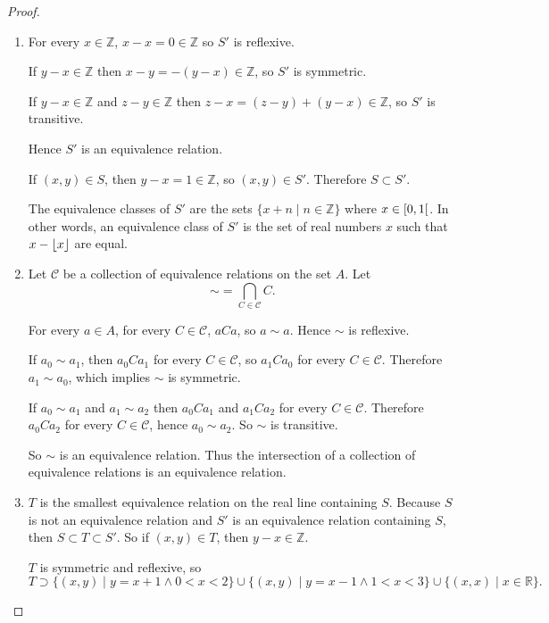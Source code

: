 \begin{proof}
    \begin{enumerate}[label={(\alph*)}]
        \item For every $x\in\mathbb{Z}$, $x - x = 0\in\mathbb{Z}$ so $S'$ is reflexive.

              If $y - x\in\mathbb{Z}$ then $x - y = -(y - x)\in\mathbb{Z}$, so $S'$ is symmetric.

              If $y - x\in\mathbb{Z}$ and $z - y\in\mathbb{Z}$ then $z - x = (z - y) + (y - x)\in\mathbb{Z}$, so $S'$ is transitive.

              Hence $S'$ is an equivalence relation.

              If $(x, y)\in S$, then $y - x = 1\in\mathbb{Z}$, so $(x, y)\in S'$. Therefore $S\subset S'$.

              The equivalence classes of $S'$ are the sets $\{ x + n \mid n\in\mathbb{Z} \}$ where $x\in \left[{0, 1}\right[$. In other words, an equivalence class of $S'$ is the set of real numbers $x$ such that $x - \left\lfloor{x}\right\rfloor$ are equal.
        \item Let $\mathscr{C}$ be a collection of equivalence relations on the set $A$. Let
              \[
                  \sim = \bigcap_{C\in\mathscr{C}}C.
              \]

              For every $a\in A$, for every $C\in\mathscr{C}$, $aCa$, so $a\sim a$. Hence $\sim$ is reflexive.

              If $a_{0}\sim a_{1}$, then $a_{0}Ca_{1}$ for every $C\in\mathscr{C}$, so $a_{1}Ca_{0}$ for every $C\in\mathscr{C}$. Therefore $a_{1}\sim a_{0}$, which implies $\sim$ is symmetric.

              If $a_{0}\sim a_{1}$ and $a_{1}\sim a_{2}$ then $a_{0}Ca_{1}$ and $a_{1}Ca_{2}$ for every $C\in\mathscr{C}$. Therefore $a_{0}Ca_{2}$ for every $C\in\mathscr{C}$, hence $a_{0}\sim a_{2}$. So $\sim$ is transitive.

              So $\sim$ is an equivalence relation. Thus the intersection of a collection of equivalence relations is an equivalence relation.
        \item $T$ is the smallest equivalence relation on the real line containing $S$. Because $S$ is not an equivalence relation and $S'$ is an equivalence relation containing $S$, then $S\subset T \subset S'$. So if $(x, y)\in T$, then $y - x\in\mathbb{Z}$.

              $T$ is symmetric and reflexive, so
              \[
                  T\supset \{ (x, y) \mid y = x + 1 \land 0 < x < 2 \} \cup \{ (x, y) \mid y = x - 1 \land 1 < x < 3 \} \cup \{ (x, x) \mid x\in\mathbb{R} \}.
              \]


\end{enumerate}
\end{proof}
